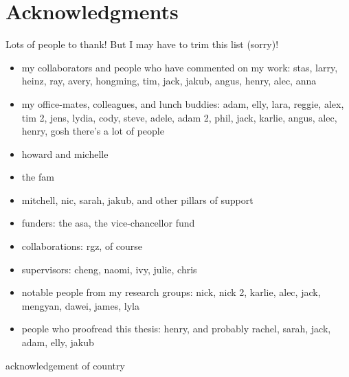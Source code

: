 \chapter*{Acknowledgments}

Lots of people to thank! But I may have to trim this list (sorry)!

\begin{itemize}
    \item my collaborators and people who have commented on my work: stas, larry, heinz, ray, avery, hongming, tim, jack, jakub, angus, henry, alec, anna
    \item my office-mates, colleagues, and lunch buddies: adam, elly, lara, reggie, alex, tim 2, jens, lydia, cody, steve, adele, adam 2, phil, jack, karlie, angus, alec, henry, gosh there's a lot of people
    \item howard and michelle
    \item the fam
    \item mitchell, nic, sarah, jakub, and other pillars of support
    \item funders: the asa, the vice-chancellor fund
    \item collaborations: rgz, of course
    \item supervisors: cheng, naomi, ivy, julie, chris
    \item notable people from my research groups: nick, nick 2, karlie, alec, jack, mengyan, dawei, james, lyla
    \item people who proofread this thesis: henry, and probably rachel, sarah, jack, adam, elly, jakub
\end{itemize}

\clearpage
acknowledgement of country